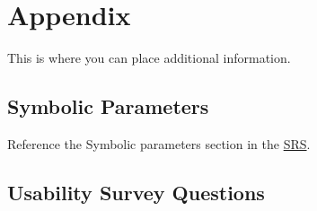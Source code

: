 \documentclass[12pt, titlepage]{article}
\begin{document}
	
	
	
	
	
	
	\newpage
	
	\section{Appendix}
	
	This is where you can place additional information.
	
	\subsection{Symbolic Parameters}
	
	Reference the Symbolic parameters section in the \href{https://github.com/RutheniumVI/UnderTree/blob/main/docs/SRS/SRS.pdf}{SRS}. 
	
	\subsection{Usability Survey Questions}
	
	
\end{document}
